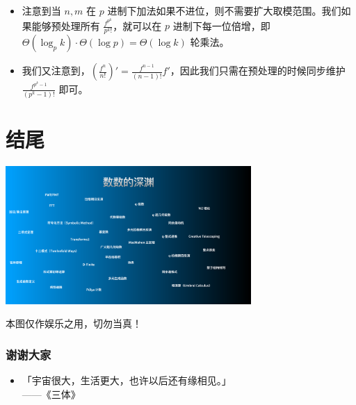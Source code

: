 \documentclass[mathserif]{ctexbeamer}
\begin{document}
\frame
{
  \begin{itemize}
  \item<1-> 注意到当 $n,m$ 在 $p$ 进制下加法如果不进位，则不需要扩大取模范围。我们如果能够预处理所有 $\frac{f^{p^k}}{p^k!}$，就可以在 $p$ 进制下每一位倍增，即 $\Theta(\log _p k) \cdot \Theta(\log p) = \Theta(\log k)$ 轮乘法。
   
  \item<2-> 我们又注意到，$\left(\frac{f^n}{n!}\right)' = \frac{f^{n-1}}{(n-1)!}f'$，因此我们只需在预处理的时候同步维护 $\frac{f^{p^k-1}}{(p^k-1)!}$ 即可。
  \end{itemize}
}

\section*{结尾}

\frame
{
  \begin{center}
  \includegraphics[width=0.70\textwidth]{deep.pdf}
  \end{center}
  
  本图仅作娱乐之用，切勿当真！
}

\frame
{
  \frametitle{谢谢大家}
  
  \begin{itemize}
  \item「宇宙很大，生活更大，也许以后还有缘相见。」\\
  \hfill ——《三体》
  \end{itemize}
}
\end{document}
